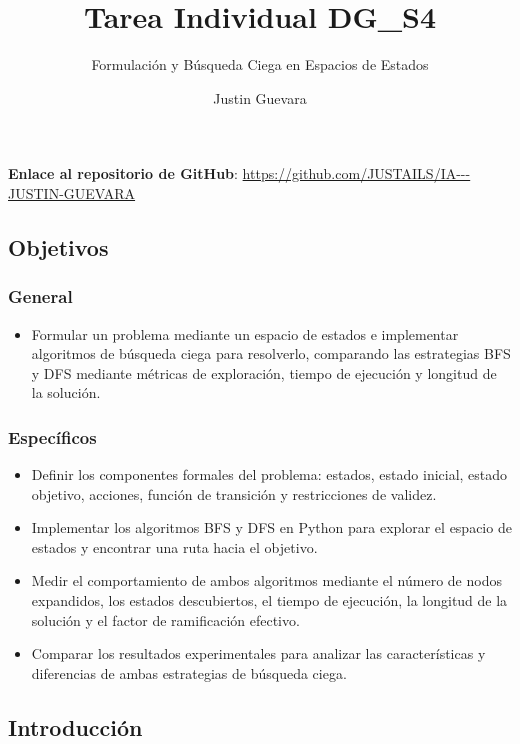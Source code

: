 \documentclass[
  spanish,
]{llncs}
\title{Tarea Individual DG\_S4}
\subtitle{Formulación y Búsqueda Ciega en Espacios de Estados}
\author{Justin Guevara}
\date{}
\providecommand{\tightlist}{%
  \setlength{\itemsep}{0pt}\setlength{\parskip}{0pt}}
\begin{document}
\maketitle


\textbf{Enlace al repositorio de GitHub}:
\url{https://github.com/JUSTAILS/IA---JUSTIN-GUEVARA}

\subsection{Objetivos}\label{objetivos}

\subsubsection{General}\label{general}

\begin{itemize}
\tightlist
\item
  Formular un problema mediante un espacio de estados e implementar
  algoritmos de búsqueda ciega para resolverlo, comparando las
  estrategias BFS y DFS mediante métricas de exploración, tiempo de
  ejecución y longitud de la solución.
\end{itemize}

\subsubsection{Específicos}\label{especuxedficos}

\begin{itemize}
\tightlist
\item
  Definir los componentes formales del problema: estados, estado
  inicial, estado objetivo, acciones, función de transición y
  restricciones de validez.
\item
  Implementar los algoritmos BFS y DFS en Python para explorar el
  espacio de estados y encontrar una ruta hacia el objetivo.
\item
  Medir el comportamiento de ambos algoritmos mediante el número de
  nodos expandidos, los estados descubiertos, el tiempo de ejecución, la
  longitud de la solución y el factor de ramificación efectivo.
\item
  Comparar los resultados experimentales para analizar las
  características y diferencias de ambas estrategias de búsqueda ciega.
\end{itemize}

\subsection{Introducción}\label{introducciuxf3n}
\end{document}
